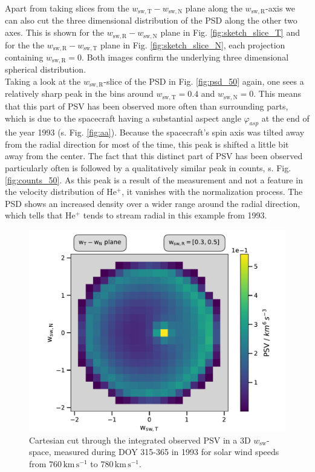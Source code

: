 Apart from taking slices from the $w_\mathrm{sw,T} - w_\mathrm{sw,N}$ plane along the $w_\mathrm{sw,R}$-axis we can also cut the three dimensional distribution of the PSD along the other two axes. This is shown for the $w_\mathrm{sw,R} - w_\mathrm{sw,N}$ plane in Fig. \ref{fig:sketch_slice_T} and for the the $w_\mathrm{sw,R} - w_\mathrm{sw,T}$ plane in Fig. \ref{fig:sketch_slice_N}, each projection containing $w_\mathrm{sw,R} = 0$.
Both images confirm the underlying three dimensional spherical distribution.
\\
Taking a look at the $w_\mathrm{sw,R}$-slice of the PSD in Fig. \ref{fig:psd_50} again, one sees a relatively sharp peak in the bins around $w_\mathrm{sw,T} = 0.4$ and $w_\mathrm{sw,N} = 0$. This means that this part of PSV has been observed more often than surrounding parts, which is due to the spacecraft having a substantial aspect angle $\varphi_{asp}$ at the end of the year 1993 (s. Fig. \ref{fig:aa}). Because the spacecraft's spin axis was tilted away from the radial direction for most of the time, this peak is shifted a little bit away from the center. The fact that this distinct part of PSV has been observed particularly often is followed by a qualitatively similar peak in counts, s. Fig. \ref{fig:counts_50}. 
As this peak is a result of the measurement and not a feature in the velocity distribution of $\mathrm{He^{+}}$, it vanishes with the normalization process. The PSD shows an increased density over a wider range around the radial direction, which tells that $\mathrm{He^{+}}$ tends to stream radial in this example from 1993.
\begin{figure}[h]
	\includegraphics[width=.85\textwidth]{Figures/slice_50_norm.pdf}
	\centering
	\caption{Cartesian cut through the integrated observed PSV in a 3D $w_\mathrm{sw}$-space, measured during DOY 315-365 in 1993 for solar wind speeds from $760 \, \mathrm{km\,s^{-1}}$ to $780 \, \mathrm{km\,s^{-1}}$.}
	\label{fig:norm_50}
\end{figure}
